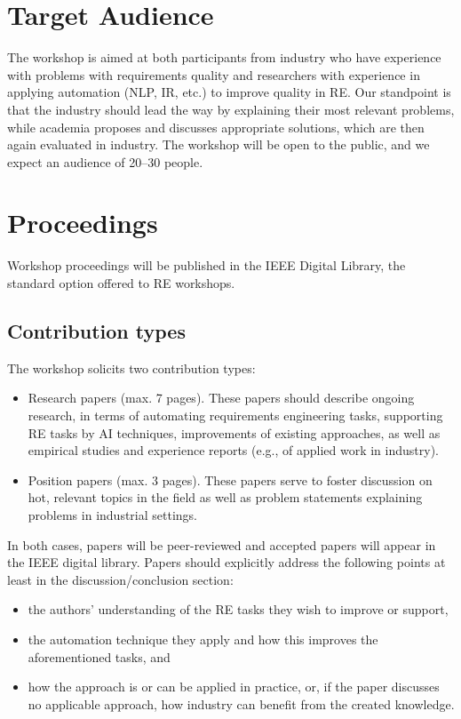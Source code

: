\documentclass[conference,9pt]{IEEEtran}
\begin{document}
\section{Target Audience}
The workshop is aimed at both participants from industry who have experience with problems with requirements quality and researchers with experience in applying automation (NLP, IR, etc.) to improve quality in RE. Our standpoint is that the industry should lead the way by explaining their most relevant problems, while academia proposes and discusses appropriate solutions, which are then again evaluated in industry.
The workshop will be open to the public, and we expect an audience of 20--30 people.

\section{Proceedings}
Workshop proceedings will be published in the IEEE Digital Library, the standard option offered to RE workshops.

\subsection{Contribution types}
The workshop solicits two contribution types:

\begin{itemize}
\item Research papers (max. 7 pages). These papers should describe ongoing research, in terms of automating requirements engineering tasks, supporting RE tasks by AI techniques, improvements of existing approaches, as well as empirical studies and experience reports (e.g., of applied work in industry).
\item Position papers (max. 3 pages). These papers serve to foster discussion on hot, relevant topics in the field as well as problem statements explaining problems in industrial settings.
\end{itemize}

In both cases, papers will be peer-reviewed and accepted papers will appear in the IEEE digital library. Papers should explicitly address the following points at least in the discussion/conclusion section:
\begin{itemize}
\item the authors' understanding of the RE tasks they wish to improve or support,
\item the automation technique they apply and how this improves the aforementioned tasks, and
\item how the approach is or can be applied in practice, or, if the paper discusses no applicable approach, how industry can benefit from the created knowledge.
\end{itemize}
\end{document}

